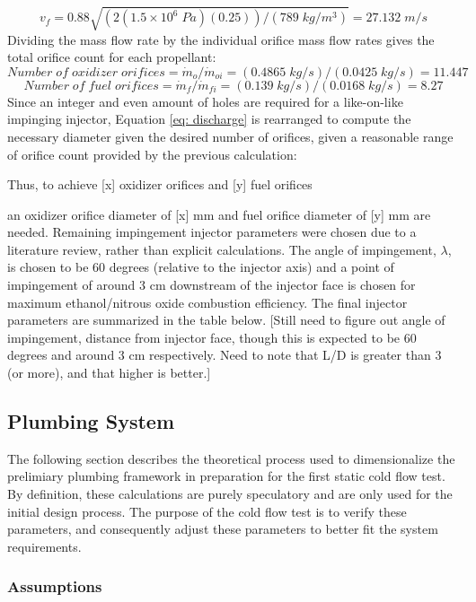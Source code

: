 \documentclass[9pt]{article} %
\numberwithin{equation}{section} %
\begin{document}
\begin{equation*}
    v_{f} = 0.88 \sqrt{(2(1.5\times 10^{6} \; Pa)(0.25))/(789 \; kg/m^{3})} = 27.132 \; m/s
\end{equation*}
Dividing the mass flow rate by the individual orifice mass flow rates gives the total orifice count for each propellant:
\begin{equation*}
    Number \; of \; oxidizer \; orifices = \dot{m}_{o}/\dot{m}_{oi} = (0.4865 \; kg/s)/(0.0425 \; kg/s) = 11.447
\end{equation*}
\begin{equation*}
    Number \; of \; fuel \; orifices = \dot{m}_{f}/\dot{m}_{fi} = (0.139 \; kg/s)/(0.0168 \; kg/s) = 8.27
\end{equation*}
Since an integer and even amount of holes are required for a like-on-like impinging injector, Equation \ref{eq: discharge} is rearranged to compute the necessary diameter given the desired number of orifices, given a reasonable range of orifice count provided by the previous calculation:

Thus, to achieve [x] oxidizer orifices and [y] fuel orifices

an oxidizer orifice diameter of [x] mm and fuel orifice diameter of [y] mm are needed.
Remaining impingement injector parameters were chosen due to a literature review, rather than explicit calculations. The angle of impingement, $\lambda$, is chosen to be 60 degrees (relative to the injector axis) and a point of impingement of around 3 cm downstream of the injector face is chosen for maximum ethanol/nitrous oxide combustion efficiency. The final injector parameters are summarized in the table below.
[Still need to figure out angle of impingement, distance from injector face, though this is expected to be 60 degrees and around 3 cm respectively. Need to note that L/D is greater than 3 (or more), and that higher is better.]

\subsection{Plumbing System}
The following section describes the theoretical process used to dimensionalize the prelimiary plumbing framework in preparation for the first static cold flow test. By definition, these calculations are purely speculatory and are only used for the initial design process. The purpose of the cold flow test is to verify these parameters, and consequently adjust these parameters to better fit the system requirements.
\subsubsection{Assumptions} \label{sec:assumptions}
\end{document}
